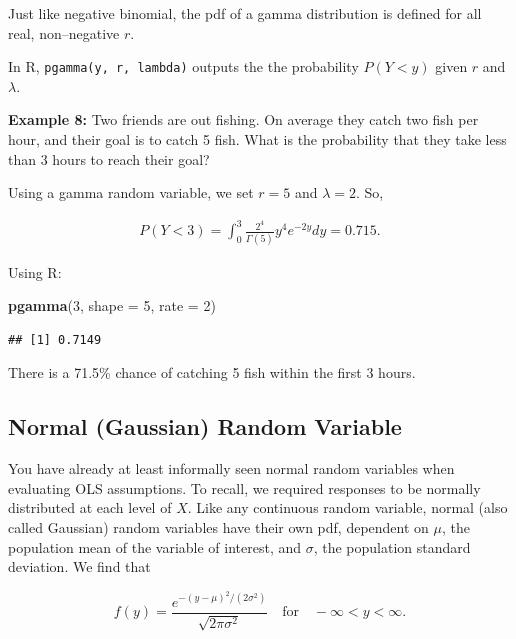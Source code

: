 \documentclass[
]{krantz}
\newenvironment{Shaded}{\begin{snugshade}}{\end{snugshade}}
\newcommand{\DataTypeTok}[1]{\textcolor[rgb]{0.27,0.27,0.27}{#1}}
\newcommand{\DecValTok}[1]{\textcolor[rgb]{0.06,0.06,0.06}{#1}}
\newcommand{\KeywordTok}[1]{\textcolor[rgb]{0.27,0.27,0.27}{\textbf{#1}}}
\newcommand{\NormalTok}[1]{#1}
\begin{document}
Just like negative binomial, the pdf of a gamma distribution is defined for all real, non--negative \(r\).

In R, \texttt{pgamma(y,\ r,\ lambda)} outputs the the probability \(P(Y < y)\) given \(r\) and \(\lambda\).

\textbf{Example 8:} Two friends are out fishing. On average they catch two fish per hour, and their goal is to catch 5 fish. What is the probability that they take less than 3 hours to reach their goal?

Using a gamma random variable, we set \(r = 5\) and \(\lambda = 2\). So,

\begin{align*}
P(Y < 3) = \int_0^3 \frac{2^4}{\Gamma(5)} y^{4} e^{-2y}dy = 0.715.
\end{align*}

Using R:

\begin{Shaded}
\begin{Highlighting}[]
\KeywordTok{pgamma}\NormalTok{(}\DecValTok{3}\NormalTok{, }\DataTypeTok{shape =} \DecValTok{5}\NormalTok{, }\DataTypeTok{rate =} \DecValTok{2}\NormalTok{)}
\end{Highlighting}
\end{Shaded}

\begin{verbatim}
## [1] 0.7149
\end{verbatim}

There is a 71.5\% chance of catching 5 fish within the first 3 hours.

\hypertarget{normal-gaussian-random-variable}{%
\subsection{Normal (Gaussian) Random Variable}\label{normal-gaussian-random-variable}}

You have already at least informally seen normal random variables when evaluating OLS assumptions. To recall, we required responses to be normally distributed at each level of \(X\). Like any continuous random variable, normal (also called Gaussian) random variables have their own pdf, dependent on \(\mu\), the population mean of the variable of interest, and \(\sigma\), the population standard deviation. We find that

\begin{equation}
f(y) =  \frac{e^{-(y-\mu)^2/ (2 \sigma^2)}}{\sqrt{2\pi\sigma^2}} \quad \textrm{for} \quad -\infty < y < \infty.
\label{eq:normalRV}
\end{equation}
\end{document}
